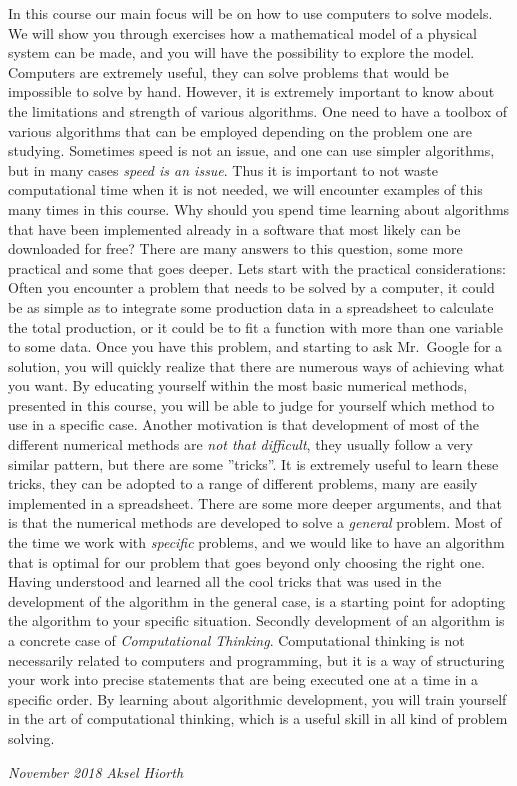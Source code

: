 \documentclass[%
oneside,                 %
final,                   %
10pt]{article}
\begin{document}
In this course our main focus will be on how to use computers to solve models. We will show you through exercises how a mathematical model of
a physical system can be made, and you will have the possibility to explore the model. Computers are extremely useful, they can solve problems that
would be impossible to solve by hand. However, it is extremely important to know about the limitations and strength of various algorithms. One need
to have a toolbox of various algorithms that can be employed depending on the problem one are studying. Sometimes speed is not an issue, and one can use
simpler algorithms, but in many cases \emph{speed is an issue}. Thus it is important to not waste computational time when it is not needed, we will encounter 
examples of this many times in this course. Why should you spend time learning about algorithms that have been implemented already in a software that 
most likely can be downloaded for free? There are many answers to this question, some more practical and some that goes deeper. Lets start with the
practical considerations: Often you encounter a problem that needs to be solved by a computer, it could be as simple as to integrate some production data 
in a spreadsheet to calculate the total production, or it could be to fit a function with more than one variable to some data. Once you have this problem, and 
starting to ask Mr.~Google for a solution, you will quickly realize that there are numerous ways of achieving what you want. By educating yourself 
within the most basic numerical methods, presented in this course, you will be able to judge for yourself which method to use in a specific case. 
Another motivation is that development of most of the different numerical methods are \emph{not that difficult}, they usually follow a very similar pattern, but
there are some ''tricks''. It is extremely useful to learn these tricks, they can be adopted to a range of different problems, many are easily implemented
in a spreadsheet. There are some more deeper arguments, and that is that the numerical methods are developed to solve a \emph{general} problem. Most of the 
time we work with \emph{specific} problems, and we would like to have an algorithm that is optimal for our problem that goes beyond only choosing the right one. 
Having understood and learned all the cool tricks that was used in the development of the algorithm in the general case, 
is a starting point for adopting the algorithm to your specific situation. Secondly development of an algorithm is a concrete case of \emph{Computational Thinking}.
Computational thinking is not necessarily related to computers and programming, but it is a way of structuring your work 
into precise statements that are being executed one at a time in a specific order. By learning about algorithmic development, you 
will train yourself in the art of computational thinking, which is a useful skill in all kind of problem solving. 


\noindent
{\it November 2018}  \hfill  {\it Aksel Hiorth}


\end{document}
